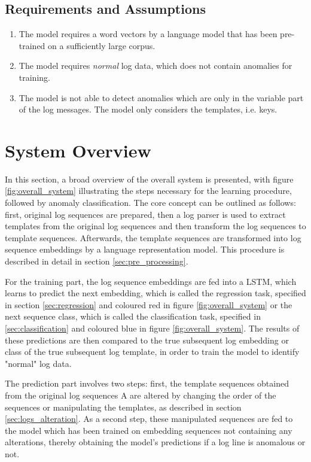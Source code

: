 \subsection{Requirements and Assumptions \label{sec:requirements_and_assumptions}}
\begin{enumerate}
	\item The model requires a word vectors by a language model that has been pre-trained on a sufficiently large corpus.
	\item The model requires \textit{normal} log data, which does not contain anomalies for training.
	\item The model is not able to detect anomalies which are only in the variable part of the log messages. The model only considers the templates, i.e. keys.
\end{enumerate}



\section{System Overview \label{sec:overall_system}}
In this section, a broad overview of the overall system is presented, with figure \ref{fig:overall_system} illustrating the steps necessary for the learning procedure, followed by anomaly classification. 
The core concept can be outlined as follows: first, original log sequences are prepared, then a log parser is used to extract templates from the original log sequences and then transform the log sequences to template sequences. Afterwards, the template sequences are transformed into log sequence embeddings by a language representation model. This procedure is described in detail in section \ref{sec:pre_processing}. 

For the training part, the log sequence embeddings are fed into a LSTM, which learns to predict the next embedding, which is called the regression task, specified in section \ref{sec:regression} and coloured red in figure \ref{fig:overall_system} or the next sequence class, which is called the classification task, specified in \ref{sec:classification} and coloured blue in figure \ref{fig:overall_system}. The results of these predictions are then compared to the true subsequent log embedding or class of the true subsequent log template, in order to train the model to identify "normal" log data.

The prediction part involves two steps: first, the template sequences obtained from the original log sequences A are altered by changing the order of the sequences or manipulating the templates, as described in section \ref{sec:logs_alteration}. As a second step, these manipulated sequences are fed to the model which has been trained on embedding sequences not containing any alterations, thereby obtaining the model's predictions if a log line is anomalous or not.

